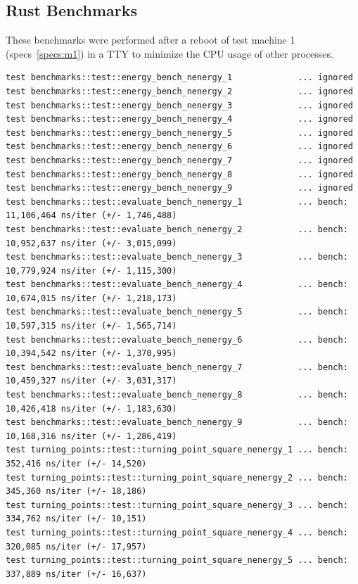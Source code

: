 \documentclass[11pt,DIV=10,final]{scrreprt} %
\renewcommand{\lstlistingname}{Code Snippet} %
\begin{document}
{\begin{appendix}
\subsection{Rust Benchmarks}
\renewcommand{\lstlistingname}{Output} %
These benchmarks were performed after a reboot of test machine 1 (specs~\ref{specs:m1}) in a TTY to minimize the CPU usage of other processes.
\begin{lstlisting}[caption={
Test run on machine 1, the energy tests were ignored because they take about 2 hours to run.
}]
test benchmarks::test::energy_bench_nenergy_1             ... ignored
test benchmarks::test::energy_bench_nenergy_2             ... ignored
test benchmarks::test::energy_bench_nenergy_3             ... ignored
test benchmarks::test::energy_bench_nenergy_4             ... ignored
test benchmarks::test::energy_bench_nenergy_5             ... ignored
test benchmarks::test::energy_bench_nenergy_6             ... ignored
test benchmarks::test::energy_bench_nenergy_7             ... ignored
test benchmarks::test::energy_bench_nenergy_8             ... ignored
test benchmarks::test::energy_bench_nenergy_9             ... ignored
test benchmarks::test::evaluate_bench_nenergy_1           ... bench:  11,106,464 ns/iter (+/- 1,746,488)
test benchmarks::test::evaluate_bench_nenergy_2           ... bench:  10,952,637 ns/iter (+/- 3,015,099)
test benchmarks::test::evaluate_bench_nenergy_3           ... bench:  10,779,924 ns/iter (+/- 1,115,300)
test benchmarks::test::evaluate_bench_nenergy_4           ... bench:  10,674,015 ns/iter (+/- 1,218,173)
test benchmarks::test::evaluate_bench_nenergy_5           ... bench:  10,597,315 ns/iter (+/- 1,565,714)
test benchmarks::test::evaluate_bench_nenergy_6           ... bench:  10,394,542 ns/iter (+/- 1,370,995)
test benchmarks::test::evaluate_bench_nenergy_7           ... bench:  10,459,327 ns/iter (+/- 3,031,317)
test benchmarks::test::evaluate_bench_nenergy_8           ... bench:  10,426,418 ns/iter (+/- 1,183,630)
test benchmarks::test::evaluate_bench_nenergy_9           ... bench:  10,168,316 ns/iter (+/- 1,286,419)
test turning_points::test::turning_point_square_nenergy_1 ... bench:     352,416 ns/iter (+/- 14,520)
test turning_points::test::turning_point_square_nenergy_2 ... bench:     345,360 ns/iter (+/- 18,186)
test turning_points::test::turning_point_square_nenergy_3 ... bench:     334,762 ns/iter (+/- 10,151)
test turning_points::test::turning_point_square_nenergy_4 ... bench:     320,085 ns/iter (+/- 17,957)
test turning_points::test::turning_point_square_nenergy_5 ... bench:     337,889 ns/iter (+/- 16,637)

\end{lstlisting}
\end{appendix}}
\end{document}
